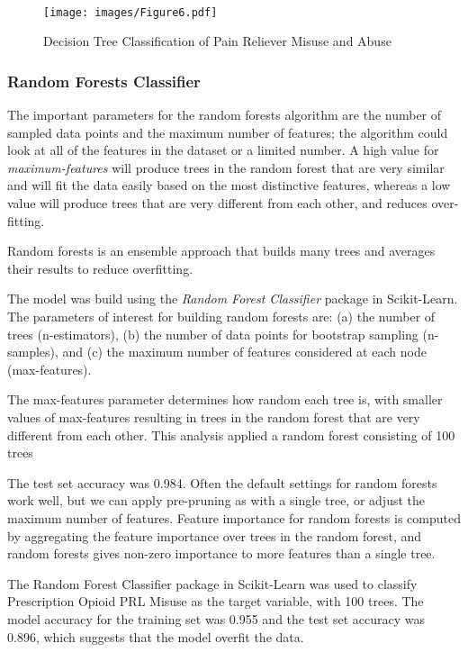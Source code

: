 \\\documentclass[sigconf]{acmart}
\begin{document}
\begin{figure}[!ht]
  \centering\texttt{[image: images/Figure6.pdf]}
  \caption{Decision Tree Classification of Pain Reliever Misuse and Abuse}
  \label{f:Figure6}
\end{figure}


\subsubsection{Random Forests Classifier}

 The important parameters for the random forests algorithm are 
the number of sampled data points and the maximum number of features; 
the algorithm could look at all of the features in the dataset or a limited 
number. A high value for \emph{maximum-features} will produce trees in the 
random forest that are very similar and will fit the data easily based on the most distinctive features, whereas a low value will 
produce trees that are very different from each other, and reduces over-
fitting. 


Random forests is an ensemble approach that builds many trees and averages 
their results to reduce overfitting. 

The model was build using the 
\emph{Random Forest Classifier} package in Scikit-Learn. The parameters of 
interest for building random forests are: (a) the number of trees 
(n-estimators), (b) the number of data points for bootstrap sampling 
(n-samples), and (c) the maximum number of features considered at each node 
(max-features). 

The max-features parameter determines how random each tree is, 
with smaller values of max-features resulting in trees in the random forest 
that are very different from each other. This analysis applied a random forest 
consisting of 100 trees 

The test set accuracy was 0.984. 
Often the default settings for random forests work well, but we can apply
pre-pruning as with a single tree, or adjust the maximum number of features. 
Feature importance for random forests is computed by aggregating the feature 
importance over trees in the random forest, and random forests gives
non-zero importance to more features than a single tree. 

The Random Forest Classifier package in Scikit-Learn was used to classify
Prescription Opioid PRL Misuse as the target variable, with 100 trees. The 
model accuracy for the training set was 0.955 and the test set accuracy was 
0.896, which suggests that the model overfit the data. 
\end{document}
